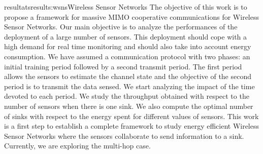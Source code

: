 \documentclass{ra2016}
\begin{document}
\begin{module}{resultats}{results:wsns}{Wireless Sensor Networks}
The objective of this work is to propose a framework for massive MIMO cooperative communications for Wireless Sensor Networks.
Our main objective is  to analyze the performances of the deployment of a large number of sensors.
This deployment should cope with a high demand for real time monitoring and should also take into account energy consumption.
We have assumed a communication protocol with two phases: an initial training period followed by a second transmit period.
The first period allows the sensors to estimate the channel state and the objective of the second period is to transmit the data sensed.
We start analyzing the impact of the time devoted to each period.
We study the throughput obtained with respect to the number of sensors when there is one sink.
We also compute the optimal number of sinks with respect to the energy spent for different values of sensors.
This work is a first step to establish a complete framework to study energy efficient Wireless Sensor Networks where the sensors collaborate to send information to a sink.
Currently, we are exploring the multi-hop case.

\end{module}
\end{document}
